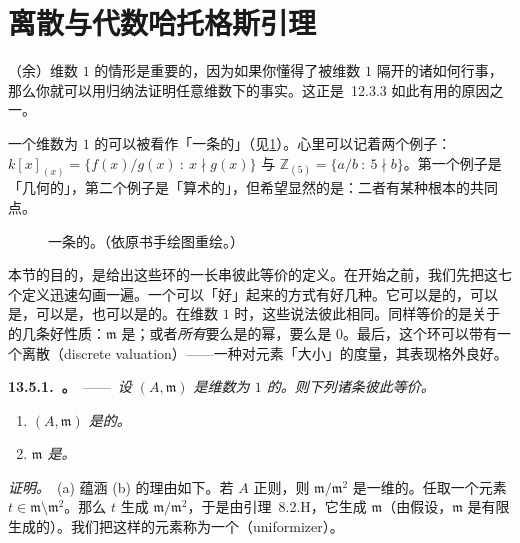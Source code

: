 
\section{离散\trValuationRing{}与代数哈托格斯引理}

（余）维数 $1$ 的情形是重要的，因为如果你懂得了被维数 $1$ 隔开的诸\trPrimeIdeal{}如何行事，那么你就可以用归纳法证明任意维数下的事实。这正是\trKrull{}\trPrincipalIdealTheorem~12.3.3 如此有用的原因之一。

一个维数为 $1$ 的\trRegular\trLocalRing{}可以被看作「一条\trSmooth{}\trCurve{}的\trGerm」（见\cref{fig:germ-of-curve}）。心里可以记着两个例子：$k[x]_{(x)}=\{f(x)/g(x)\ :\ x\nmid g(x)\}$ 与 $\mathbb{Z}_{(5)}=\{a/b\ :\ 5\nmid b\}$。第一个例子是「几何的」，第二个例子是「算术的」，但希望显然的是：二者有某种根本的共同点。

\begin{figure}[htbp]
\centering
{}
\caption{一条\trCurve{}的\trGerm。（依原书手绘图重绘。）}\label{fig:germ-of-curve}
\end{figure}

本节的目的，是给出这些环的一长串彼此等价的定义。在开始之前，我们先把这七个定义迅速勾画一遍。一个\trNoetherian\trLocalRing{}可以「好」起来的方式有好几种。它可以是\trRegular{}的，可以是\trPID，可以是\trUFD，也可以是\trNormal{}的。在维数 $1$ 时，这些说法彼此相同。同样等价的是关于\trIdeal{}的几条好性质：$\mathfrak{m}$ 是\trPrincipalIdeal；或者\emph{所有}\trIdeal{}要么是\trMaximalIdeal{}的幂，要么是 $0$。最后，这个环可以带有一个离散\trValuation（discrete valuation）——一种对元素「大小」的度量，其表现格外良好。

\textbf{13.5.1.\ \trhTheorem{}。}\ ——\ \emph{设 $(A,\mathfrak{m})$ 是维数为 $1$ 的\trNoetherian\trLocalRing。则下列诸条彼此等价。}
\begin{enumerate}[label=(\alph*)]
\item \emph{$(A,\mathfrak{m})$ 是\trRegular{}的。}
\item \emph{$\mathfrak{m}$ 是\trPrincipalIdeal。}
\end{enumerate}

\emph{证明。}\ (a) 蕴涵 (b) 的理由如下。若 $A$ 正则，则 $\mathfrak{m}/\mathfrak{m}^2$ 是一维的。任取一个元素 $t\in\mathfrak{m}\setminus\mathfrak{m}^2$。那么 $t$ 生成 $\mathfrak{m}/\mathfrak{m}^2$，于是由\trNakayama{}引理~8.2.H，它生成 $\mathfrak{m}$（由\trNoetherian{}假设，$\mathfrak{m}$ 是有限生成的）。我们把这样的元素称为一个\textbf{\trUniformizer}（uniformizer）。

